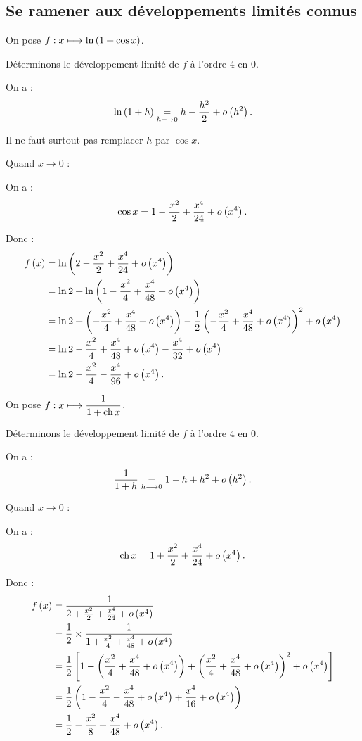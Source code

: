 \subsection{Se ramener aux développements limités connus}

\begin{ex}
On pose \(f:x\longmapsto\ln\left(1+\cos x\right)\).

Déterminons le développement limité de \(f\) à l'ordre 4 en \(0\).

On a : \[\ln\left(1+h\right)\underset{h\longrightarrow0}{=}h-\dfrac{h^2}{2}+o\left(h^2\right).\]

Il ne faut surtout pas remplacer \(h\) par \(\cos x\).

Quand \(x\to0\) :

On a : \[\cos x=1-\dfrac{x^2}{2}+\dfrac{x^4}{24}+o\left(x^4\right).\]

Donc : \[\begin{aligned}
f\left(x\right)&=\ln\left(2-\dfrac{x^2}{2}+\dfrac{x^4}{24}+o\left(x^4\right)\right) \\
&=\ln2+\ln\left(1-\dfrac{x^2}{4}+\dfrac{x^4}{48}+o\left(x^4\right)\right) \\
&=\ln2+\left(-\dfrac{x^2}{4}+\dfrac{x^4}{48}+o\left(x^4\right)\right)-\dfrac{1}{2}\left(-\dfrac{x^2}{4}+\dfrac{x^4}{48}+o\left(x^4\right)\right)^2+o\left(x^4\right) \\
&=\ln2-\dfrac{x^2}{4}+\dfrac{x^4}{48}+o\left(x^4\right)-\dfrac{x^4}{32}+o\left(x^4\right) \\
&=\ln2-\dfrac{x^2}{4}-\dfrac{x^4}{96}+o\left(x^4\right).
\end{aligned}\]
\end{ex}

\begin{ex}
On pose \(f:x\longmapsto\dfrac{1}{1+\operatorname{ch} x}\).

Déterminons le développement limité de \(f\) à l'ordre 4 en \(0\).

On a : \[\dfrac{1}{1+h}\underset{h\longrightarrow0}{=}1-h+h^2+o\left(h^2\right).\]

Quand \(x\to0\) :

On a : \[\operatorname{ch} x=1+\dfrac{x^2}{2}+\dfrac{x^4}{24}+o\left(x^4\right).\]

Donc : \[\begin{aligned}
f\left(x\right)&=\dfrac{1}{2+\frac{x^2}{2}+\frac{x^4}{24}+o\left(x^4\right)} \\
&=\dfrac{1}{2}\times\dfrac{1}{1+\frac{x^2}{4}+\frac{x^4}{48}+o\left(x^4\right)} \\
&=\dfrac{1}{2}\left[1-\left(\dfrac{x^2}{4}+\dfrac{x^4}{48}+o\left(x^4\right)\right)+\left(\dfrac{x^2}{4}+\dfrac{x^4}{48}+o\left(x^4\right)\right)^2+o\left(x^4\right)\right] \\
&=\dfrac{1}{2}\left(1-\dfrac{x^2}{4}-\dfrac{x^4}{48}+o\left(x^4\right)+\dfrac{x^4}{16}+o\left(x^4\right)\right) \\
&=\dfrac{1}{2}-\dfrac{x^2}{8}+\dfrac{x^4}{48}+o\left(x^4\right).
\end{aligned}\]
\end{ex}

